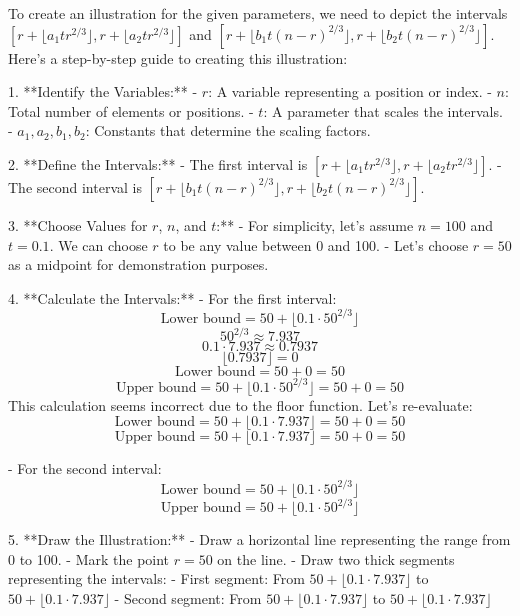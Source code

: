 To create an illustration for the given parameters, we need to depict the intervals \( [r + \lfloor a_1 t r^{2/3} \rfloor, r + \lfloor a_2 t r^{2/3} \rfloor] \) and \( [r + \lfloor b_1 t (n-r)^{2/3} \rfloor, r + \lfloor b_2 t (n-r)^{2/3} \rfloor] \). Here's a step-by-step guide to creating this illustration:

1. **Identify the Variables:**
   - \( r \): A variable representing a position or index.
   - \( n \): Total number of elements or positions.
   - \( t \): A parameter that scales the intervals.
   - \( a_1, a_2, b_1, b_2 \): Constants that determine the scaling factors.

2. **Define the Intervals:**
   - The first interval is \( [r + \lfloor a_1 t r^{2/3} \rfloor, r + \lfloor a_2 t r^{2/3} \rfloor] \).
   - The second interval is \( [r + \lfloor b_1 t (n-r)^{2/3} \rfloor, r + \lfloor b_2 t (n-r)^{2/3} \rfloor] \).

3. **Choose Values for \( r \), \( n \), and \( t \):**
   - For simplicity, let's assume \( n = 100 \) and \( t = 0.1 \). We can choose \( r \) to be any value between 0 and 100.
   - Let's choose \( r = 50 \) as a midpoint for demonstration purposes.

4. **Calculate the Intervals:**
   - For the first interval:
     \[
     \text{Lower bound} = 50 + \lfloor 0.1 \cdot 50^{2/3} \rfloor
     \]
     \[
     50^{2/3} \approx 7.937
     \]
     \[
     0.1 \cdot 7.937 \approx 0.7937
     \]
     \[
     \lfloor 0.7937 \rfloor = 0
     \]
     \[
     \text{Lower bound} = 50 + 0 = 50
     \]
     \[
     \text{Upper bound} = 50 + \lfloor 0.1 \cdot 50^{2/3} \rfloor = 50 + 0 = 50
     \]
     This calculation seems incorrect due to the floor function. Let's re-evaluate:
     \[
     \text{Lower bound} = 50 + \lfloor 0.1 \cdot 7.937 \rfloor = 50 + 0 = 50
     \]
     \[
     \text{Upper bound} = 50 + \lfloor 0.1 \cdot 7.937 \rfloor = 50 + 0 = 50
     \]

   - For the second interval:
     \[
     \text{Lower bound} = 50 + \lfloor 0.1 \cdot 50^{2/3} \rfloor
     \]
     \[
     \text{Upper bound} = 50 + \lfloor 0.1 \cdot 50^{2/3} \rfloor
     \]

5. **Draw the Illustration:**
   - Draw a horizontal line representing the range from 0 to 100.
   - Mark the point \( r = 50 \) on the line.
   - Draw two thick segments representing the intervals:
     - First segment: From \( 50 + \lfloor 0.1 \cdot 7.937 \rfloor \) to \( 50 + \lfloor 0.1 \cdot 7.937 \rfloor \)
     - Second segment: From \( 50 + \lfloor 0.1 \cdot 7.937 \rfloor \) to \( 50 + \lfloor 0.1 \cdot 7.937 \rfloor \)

